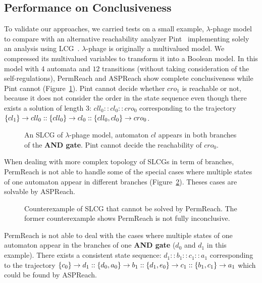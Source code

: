 \subsection{Performance on Conclusiveness}
To validate our approaches, we carried tests on a small example, $\lambda$-phage model~\cite{thieffry1995dynamical} to compare with an alternative reachability analyzer Pint~\cite{pauleve2012} implementing solely an analysis using LCG~\cite{pauleve2017reduction,folschette2015,pauleve2011}.
$\lambda$-phage is originally a multivalued model.
We compressed its multivalued variables to transform it into a Boolean model.
In this model with 4 automata and $12$ transitions (without taking consideration of the self-regulations),
PermReach and ASPReach show complete conclusiveness while Pint cannot (Figure~\ref{fig:LCG_lambdaPhage}). %
Pint cannot decide whether $cro_1$ is reachable or not, because it does not consider the order in the state sequence even though there exists a solution of length 3: $cll_0::cl_0::cro_0$ corresponding to the trajectory $\acm{cl_1}{cll_1}{cll_0}::\acm{cll_0}{cl_1}{cl_0}::\acm{cll_0,cl_0}{cro_0}{cro_0}$.
\begin{figure}[ht]
\centering
    
    \caption[SLCG of $\lambda$-phage model]{An SLCG of $\lambda$-phage model, automaton $cl$ appears in both branches of the \textbf{AND gate}.
    Pint cannot decide the reachability of $cro_0$.}
    \label{fig:LCG_lambdaPhage}
\end{figure}

When dealing with more complex topology of SLCGs in term of branches, PermReach is not able to handle some of the special cases where multiple states of one automaton appear in different branches (Figure~\ref{fig:countexPerm}).
Theses cases are solvable by \mbox{ASPReach}.

\begin{figure}[ht]
    \centering
    
    \caption[Counterexample of PermReach]{Counterexample of SLCG that cannot be solved by PermReach. The former counterexample shows PermReach is not fully inconclusive.}\label{fig:countexPerm}
\end{figure}

PermReach is not able to deal with the cases where multiple states of one automaton appear in the branches of one \textbf{AND gate} ($d_0$ and $d_1$ in this example).
There exists a consistent state sequence: $d_1::b_1::c_1::a_1$ corresponding to the trajectory $\acm{c_0}{d_0}{d_1}::\acm{d_0,a_0}{b_0}{b_1}::\acm{d_1,e_0}{c_0}{c_1}::\acm{b_1,c_1}{a_0}{a_1}$ which could be found by ASPReach.

